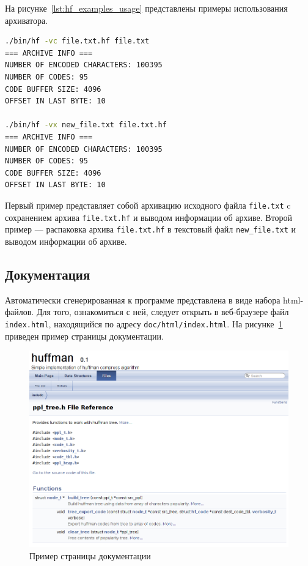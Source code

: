 На рисунке~\ref{lst:hf_examples_usage} представлены примеры использования
архиватора.

\begin{lstlisting}[basicstyle=\scriptsize\ttfamily,
                   numberstyle=\scriptsize\ttfamily,
                   xleftmargin=7mm,
                   language=bash,
                   caption=Примеры использования архиватора,
                   label=lst:hf_examples_usage]
./bin/hf -vc file.txt.hf file.txt 
=== ARCHIVE INFO ===
NUMBER OF ENCODED CHARACTERS: 100395
NUMBER OF CODES: 95
CODE BUFFER SIZE: 4096
OFFSET IN LAST BYTE: 10

./bin/hf -vx new_file.txt file.txt.hf
=== ARCHIVE INFO ===
NUMBER OF ENCODED CHARACTERS: 100395
NUMBER OF CODES: 95
CODE BUFFER SIZE: 4096
OFFSET IN LAST BYTE: 10
\end{lstlisting}

Первый пример представляет собой архивацию исходного файла \texttt{file.txt}
c сохранением архива \texttt{file.txt.hf} и выводом информации об архиве.
Второй пример --- распаковка архива \texttt{file.txt.hf}
в текстовый файл \texttt{new\_file.txt} и выводом информации об архиве.

\subsection{Документация}

Автоматически сгенерированная к программе представлена в виде набора
html-файлов. Для того, ознакомиться с ней, следует открыть в веб-браузере
файл \texttt{index.html}, находящийся по адресу \texttt{doc/html/index.html}.
На рисунке~\ref{pic:documentation} приведен пример страницы документации.

\begin{figure}[h!]
  \centering
  \includegraphics[width=150mm]{pic/documentation.png}
  \caption{Пример страницы документации}
  \label{pic:documentation}
\end{figure}
